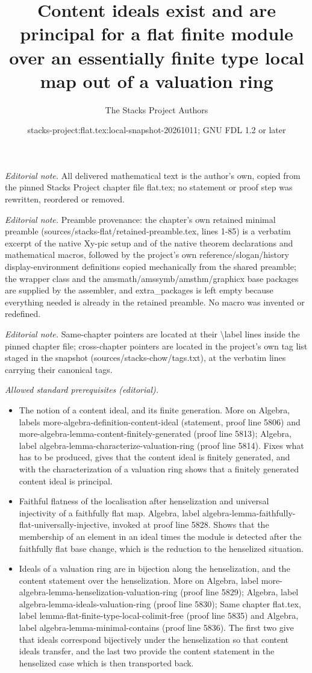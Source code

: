 \documentclass[10pt,a4paper]{amsart}
\title{Content ideals exist and are principal for a flat finite module over an essentially finite type local map out of a valuation ring}
\author{The Stacks Project Authors}
\date{stacks-project:flat.tex:local-snapshot-20261011; GNU FDL 1.2 or later}
\theoremstyle{plain}
\theoremstyle{definition}
\theoremstyle{remark}
\numberwithin{equation}{subsection}
\begin{document}
\maketitle
\noindent\textit{Editorial note.} All delivered mathematical text is the author's own, copied from the pinned Stacks Project chapter file flat.tex; no statement or proof step was rewritten, reordered or removed.\par\medskip
\noindent\textit{Editorial note.} Preamble provenance: the chapter's own retained minimal preamble (sources/stacks-flat/retained-preamble.tex, lines 1-85) is a verbatim excerpt of the native Xy-pic setup and of the native theorem declarations and mathematical macros, followed by the project's own reference/slogan/history display-environment definitions copied mechanically from the shared preamble; the wrapper class and the amsmath/amssymb/amsthm/graphicx base packages are supplied by the assembler, and extra\_packages is left empty because everything needed is already in the retained preamble. No macro was invented or redefined.\par\medskip
\noindent\textit{Editorial note.} Same-chapter pointers are located at their \textbackslash{}label lines inside the pinned chapter file; cross-chapter pointers are located in the project's own tag list staged in the snapshot (sources/stacks-chow/tags.txt), at the verbatim lines carrying their canonical tags.\par\medskip
\noindent\textit{Allowed standard prerequisites (editorial).}\begin{itemize}
\item The notion of a content ideal, and its finite generation. More on Algebra, labels more-algebra-definition-content-ideal (statement, proof line 5806) and more-algebra-lemma-content-finitely-generated (proof line 5813); Algebra, label algebra-lemma-characterize-valuation-ring (proof line 5814). Fixes what has to be produced, gives that the content ideal is finitely generated, and with the characterization of a valuation ring shows that a finitely generated content ideal is principal.
\item Faithful flatness of the localisation after henselization and universal injectivity of a faithfully flat map. Algebra, label algebra-lemma-faithfully-flat-universally-injective, invoked at proof line 5828. Shows that the membership of an element in an ideal times the module is detected after the faithfully flat base change, which is the reduction to the henselized situation.
\item Ideals of a valuation ring are in bijection along the henselization, and the content statement over the henselization. More on Algebra, label more-algebra-lemma-henselization-valuation-ring (proof line 5829); Algebra, label algebra-lemma-ideals-valuation-ring (proof line 5830); Same chapter flat.tex, label lemma-flat-finite-type-local-colimit-free (proof line 5835) and Algebra, label algebra-lemma-minimal-contains (proof line 5836). The first two give that ideals correspond bijectively under the henselization so that content ideals transfer, and the last two provide the content statement in the henselized case which is then transported back.
\end{itemize}\medskip
\end{document}
